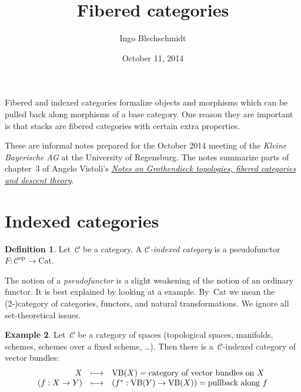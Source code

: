 \documentclass[a4paper,english,12pt]{scrartcl}
\theoremstyle{definition}
\newtheorem{defn}{Definition}[section]
\newtheorem{ex}[defn]{Example}
\theoremstyle{plain}
\theoremstyle{remark}
\newcommand{\C}{\mathcal{C}}
\newcommand{\op}{\mathrm{op}}
\newcommand{\Cat}{\mathrm{Cat}}
\newcommand{\VB}{\mathrm{VB}}
\begin{document}
\title{Fibered categories}
\author{Ingo Blechschmidt}
\date{October 11, 2014}
\maketitle

\begin{center}\begin{minipage}{0.8\textwidth}
Fibered and indexed categories formalize objects and morphisms
which can be pulled back along morphisms of a base category. One reason they
are important is that stacks are fibered categories with certain extra
properties.\medskip

These are informal notes prepared for the October 2014 meeting of the \emph{Kleine
Bayerische AG} at the University of Regensburg. The notes summarize parts of
chapter~3 of Angelo Vistoli's
\href{http://homepage.sns.it/vistoli/descent.pdf}{\emph{Notes on Grothendieck
topologies, fibered categories and descent theory}}.
\end{minipage}\end{center}
\vspace{1em}

\tableofcontents

\section{Indexed categories}

\begin{defn}Let~$\C$ be a category. A \emph{$\C$-indexed category} is a
pseudofunctor~$F : \C^\op \to \Cat$.\end{defn}

The notion of a \emph{pseudofunctor} is a slight weakening of the notion of an
ordinary functor. It is best explained by looking at a example. By~$\Cat$ we
mean the (2-)category of categories, functors, and natural transformations. We
ignore all set-theoretical issues.

\begin{ex}\label{ex:vb}Let~$\C$ be a category of spaces (topological spaces,
manifolds, schemes, schemes over a fixed scheme, \ldots). Then there is
a~$\C$-indexed category of vector bundles:
\[ \begin{array}{@{}rcl@{}}
  X &\longmapsto& \VB(X) = \text{category of vector bundles on~$X$} \\
  (f : X \to Y) &\longmapsto&
    (f^* : \VB(Y) \to \VB(X)) = \text{pullback along~$f$}
\end{array} \]
\end{ex}
\end{document}

